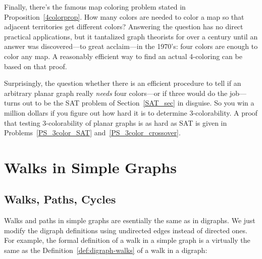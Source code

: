 Finally, there's the famous map coloring problem stated in
Proposition~\ref{4colorprop}.  How many colors are needed to color a
map so that adjacent territories get different colors?  Answering the
question has no direct practical applications, but it tantalized graph
theorists for over a century until an answer was discovered---to great
acclaim---in the 1970's: four colors are enough to color any map.  A
reasonably efficient way to find an actual 4-coloring can be based on
that proof.

Surprisingly, the question whether there is an efficient procedure to
tell if an arbitrary planar graph really \emph{needs} four colors---or
if three would do the job---turns out to be the SAT problem of
Section~\ref{SAT_sec} in disguise.  So you win a million dollars if
you figure out how hard it is to determine 3-colorability.  A proof
that testing 3-colorability of planar graphs is as hard as SAT is
given in Problems~\ref{PS_3color_SAT}
and~\ref{PS_3color_crossover}.

\iffalse
Planarity is another property with important colorability consequences.
The famous 4-Color Theorem says that every planar graph is 4-colorable.
This is a hard result to prove, but we will come close in
Chapter~\ref{planar_graphs_chap} where we define planar graphs and prove
that they are 5-colorable.
\fi

\begin{problems}

\classproblems
{}

\homeworkproblems
{}

\examproblems
{}

\end{problems}



\section{Walks in Simple Graphs}\label{sec:connectedness}

\subsection{Walks, Paths, Cycles}
Walks and paths in simple graphs are esentially the same as in
digraphs.  We just modify the digraph definitions using undirected
edges instead of directed ones.  For example, the formal definition of
a walk in a simple graph is a virtually the same as the
Definition~\ref{def:digraph-walks} of a walk in a digraph:

